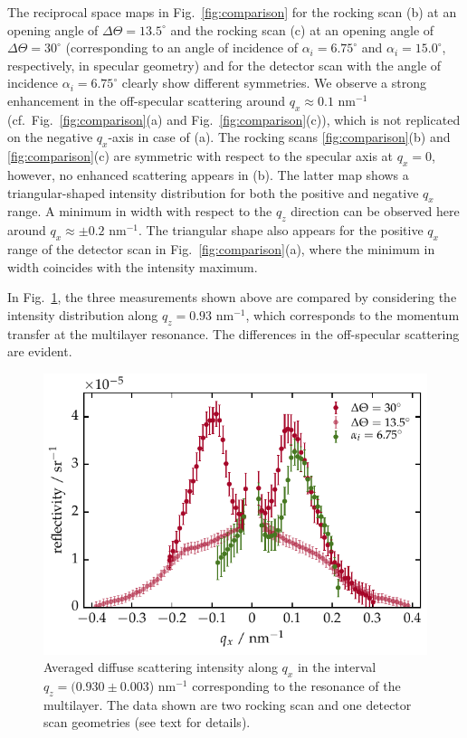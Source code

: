 The reciprocal space maps in Fig.~\ref{fig:comparison} for the rocking scan (b) at an opening angle of $\Delta \Theta = 13.5^\circ$ and the rocking scan (c) at an opening angle of $\Delta \Theta = 30^\circ$ (corresponding to an angle of incidence of $\alpha_i = 6.75^\circ$ and $\alpha_i = 15.0^\circ$, respectively, in specular geometry) and for the detector scan with the angle of incidence $\alpha_i = 6.75^\circ$ clearly show different symmetries. We observe a strong enhancement in the off-specular scattering around $q_x\approx0.1$ nm$^{-1}$ (cf.~Fig.~\ref{fig:comparison}(a) and Fig.~\ref{fig:comparison}(c)), which is not replicated on the negative $q_x$-axis in case of (a). The rocking scans \ref{fig:comparison}(b) and \ref{fig:comparison}(c) are symmetric with respect to the specular axis at $q_x=0$, however, no enhanced scattering appears in (b). The latter map shows a triangular-shaped intensity distribution for both the positive and 
negative $q_x$ range. A minimum in width with respect to the $q_z$ direction can be observed here around $q_x \approx \pm 0.2$ nm$^{-1}$. The triangular shape also appears for the 
positive $q_x$ range 
of the detector scan in Fig.~\ref{fig:comparison}(a), where the minimum in width coincides with the intensity maximum.


In Fig.~\ref{fig:BraggSheet_DetectorAndRocking}, the three measurements shown above are compared by considering the intensity distribution along $q_z=0.93$ nm$^{-1}$, which corresponds to the momentum transfer at the multilayer resonance. The differences in the off-specular scattering are evident. 
\begin{figure}[htbp]
	\includegraphics{img/PTB17_diffuse_BraggSheet_DetectorAndRocking} \caption{Averaged diffuse scattering intensity along $q_x$ in the interval  $q_z=(0.930 \pm 0.003$) nm$^{-1}$ corresponding to the resonance of the multilayer. The data shown are two rocking scan and one detector scan geometries (see text for details).} \label{fig:BraggSheet_DetectorAndRocking} 
\end{figure}

